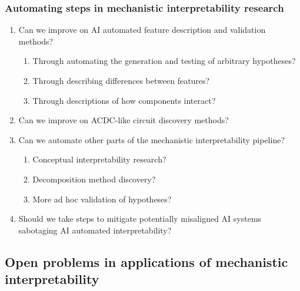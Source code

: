 \subsubsection{Automating steps in mechanistic interpretability research}
\begin{enumerate}
    \item Can we improve on AI automated feature description and validation methods?
    \begin{enumerate}[label=\alph*.]
        \item Through automating the generation and testing of arbitrary hypotheses?
        \item Through describing differences between features?
        \item Through descriptions of how components interact?
    \end{enumerate}
    
    \item Can we improve on ACDC-like circuit discovery methods?
    
    \item Can we automate other parts of the mechanistic interpretability pipeline?
    \begin{enumerate}[label=\alph*.]
        \item Conceptual interpretability research?
        \item Decomposition method discovery?
        \item More ad hoc validation of hypotheses?
    \end{enumerate}
    
    \item Should we take steps to mitigate potentially misaligned AI systems sabotaging AI automated interpretability?
\end{enumerate}

\subsection{Open problems in applications of mechanistic interpretability}

